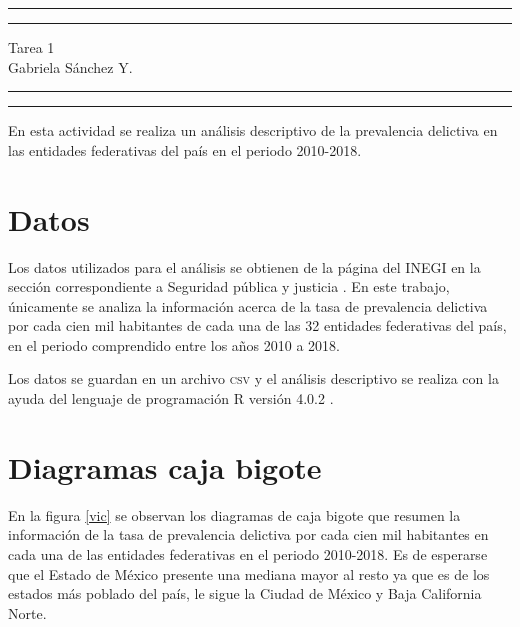 \documentclass[12pt]{article}
\begin{document}
\thispagestyle{empty}
\hrule height2.5pt
\vspace{.1cm}
\hrule height1pt

\begin{center}
Tarea 1\\
Gabriela S\'anchez Y.\\
\end{center}

\vspace{.3cm}
\hrule height1pt
\vspace{.1cm}
\hrule height2.5pt
\vspace*{.5cm}

En esta actividad se realiza un análisis descriptivo de la prevalencia delictiva en las entidades federativas del país en el periodo 2010-2018.

\section{Datos}

Los datos utilizados para el análisis se obtienen de la página del INEGI en la sección correspondiente a Seguridad pública y justicia \cite{inegi}. En este trabajo, únicamente se analiza la información acerca de la tasa de prevalencia delictiva por cada cien mil habitantes de cada una de las 32 entidades federativas del país, en el periodo comprendido entre los años 2010 a 2018.


Los datos se guardan en un archivo \textsc{csv} y el análisis descriptivo se realiza con la ayuda del lenguaje de programación \textsc{R} versión 4.0.2 \cite{r}.


\section{Diagramas caja bigote}

En la figura \ref{vic} se observan los diagramas de caja bigote que resumen la información de la tasa de prevalencia delictiva por cada cien mil habitantes en cada una de las entidades federativas en el periodo 2010-2018. Es de esperarse que el Estado de México presente una mediana mayor al resto ya que es de los estados más poblado del país, le sigue la Ciudad de México y Baja California Norte.
\end{document}
